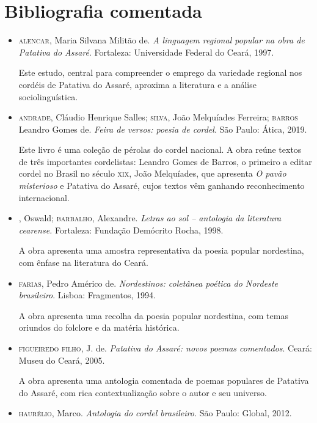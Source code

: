 \documentclass[12pt]{extarticle}
\begin{document}
\section{Bibliografia comentada}

\begin{itemize}

\item \textsc{alencar}, Maria Silvana Militão de. \textit{A linguagem regional
popular na obra de Patativa do Assaré}. Fortaleza: Universidade
Federal do Ceará, 1997.

Este estudo, central para compreender o emprego da variedade regional
nos cordéis de Patativa do Assaré, aproxima a literatura e a análise
sociolinguística.

\item \textsc{andrade}, Cláudio Henrique Salles; \textsc{silva}, João Melquíades Ferreira;
\textsc{barros} Leandro Gomes de. \textit{Feira de versos: poesia de cordel}.
São Paulo: Ática, 2019.

Este livro é uma coleção de pérolas do cordel nacional. A obra reúne
textos de três importantes cordelistas: Leandro Gomes de Barros, o
primeiro a editar cordel no Brasil no século \textsc{xix}, João Melquíades, que
apresenta \emph{O pavão misterioso} e Patativa do Assaré, cujos textos
vêm ganhando reconhecimento internacional.

\item {}, Oswald; \textsc{barbalho}, Alexandre. \textit{Letras ao sol --
antologia da literatura cearense.} Fortaleza: Fundação Demócrito
Rocha, 1998.

A obra apresenta uma amostra representativa da poesia popular
nordestina, com ênfase na literatura do Ceará.

\item \textsc{farias}, Pedro Américo de. \textit{Nordestinos: coletânea poética do
Nordeste brasileiro}. Lisboa: Fragmentos, 1994.

A obra apresenta uma recolha da poesia popular nordestina, com temas
oriundos do folclore e da matéria histórica.

\item \textsc{figueiredo filho}, J. de. \textit{Patativa do Assaré: novos poemas
comentados}. Ceará: Museu do Ceará, 2005.

A obra apresenta uma antologia comentada de poemas populares de Patativa
do Assaré, com rica contextualização sobre o autor e seu universo.

\item \textsc{haurélio}, Marco. \textit{Antologia do cordel brasileiro.} São Paulo:
Global, 2012.


\end{itemize}
\end{document}
